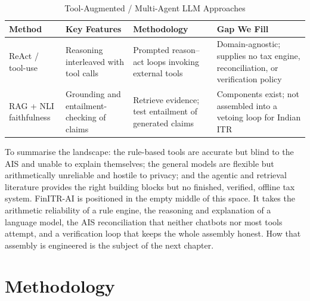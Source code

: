 \documentclass[12pt, a4paper, oneside]{report}
\newcommand{\algname}[1]{\par\vspace{0.6em}\noindent\textbf{\ttfamily #1}\nopagebreak}
\begin{document}
\begin{table}[H]
\centering
\caption{Tool-Augmented / Multi-Agent LLM Approaches}
\label{tab:cat-c-comparison}
\small
\begin{tabularx}{\textwidth}{|l|X|X|X|}
\hline
\textbf{Method} & \textbf{Key Features} & \textbf{Methodology} & \textbf{Gap We Fill} \\
\hline
ReAct / tool-use \cite{ref7} & Reasoning interleaved with tool calls & Prompted reason--act loops invoking external tools & Domain-agnostic; supplies no tax engine, reconciliation, or verification policy \\
\hline
RAG + NLI faithfulness \cite{ref8}\cite{ref9} & Grounding and entailment-checking of claims & Retrieve evidence; test entailment of generated claims & Components exist; not assembled into a vetoing loop for Indian ITR \\
\hline
\end{tabularx}
\end{table}

To summarise the landscape: the rule-based tools are accurate but blind to the
AIS and unable to explain themselves; the general models are flexible but
arithmetically unreliable and hostile to privacy; and the agentic and retrieval
literature provides the right building blocks but no finished, verified, offline
tax system. FinITR-AI is positioned in the empty middle of this space. It takes
the arithmetic reliability of a rule engine, the reasoning and explanation of a
language model, the AIS reconciliation that neither chatbots nor most tools
attempt, and a verification loop that keeps the whole assembly honest. How that
assembly is engineered is the subject of the next chapter.



\chapter{Methodology}
\label{chap:methodology}
\end{document}
